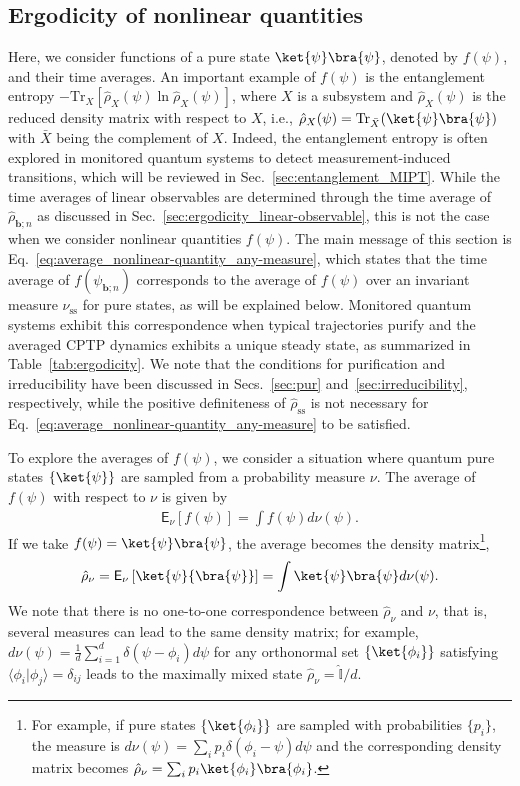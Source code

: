 \documentclass[preprint,pteplogo]{ptephy_v2}%
\numberwithin{equation}{section}
\theoremstyle{definition}
\newcommand{\ketbra}[1]{\ket{#1}\bra{#1}}
\begin{document}
\subsection{Ergodicity of nonlinear quantities}
\label{sec:ergodicity_nonlinear-quantity}
Here, we consider functions of a pure state $\ketbra{\psi}$, denoted by $f(\psi)$, and their time averages. 
An important example of $f(\psi)$ is the entanglement entropy $-\mathrm{Tr}_X\left[\hat{\rho}_X(\psi)\ln\hat{\rho}_X(\psi)\right]$, where $X$ is a subsystem and $\hat{\rho}_X(\psi)$ is the reduced density matrix with respect to $X$, i.e., $\hat{\rho}_X(\psi)=\mathrm{Tr}_{\bar{X}}(\ket{\psi}\bra{\psi})$ with $\bar{X}$ being the complement of $X$. 
Indeed, the entanglement entropy is often explored in monitored quantum systems to detect measurement-induced transitions, which will be reviewed in Sec.~\ref{sec:entanglement_MIPT}. 
While the time averages of linear observables are determined through the time average of $\hat{\rho}_{\bm{b};n}$ as discussed in Sec.~\ref{sec:ergodicity_linear-observable}, this is not the case when we consider nonlinear quantities $f(\psi)$. 
The main message of this section is Eq.~\eqref{eq:average_nonlinear-quantity_any-measure}, which states that the time average of $f(\psi_{\bm{b};n})$ corresponds to the average of $f(\psi)$ over an invariant measure $\nu_\mathrm{ss}$ for pure states, as will be explained below. 
Monitored quantum systems exhibit this correspondence when typical trajectories purify and the averaged CPTP dynamics exhibits a unique steady state, as summarized in Table~\ref{tab:ergodicity}. 
We note that the conditions for purification and irreducibility have been discussed in Secs.~\ref{sec:pur} and~\ref{sec:irreducibility}, respectively, while the positive definiteness of $\hat{\rho}_\mathrm{ss}$ is not necessary for Eq.~\eqref{eq:average_nonlinear-quantity_any-measure} to be satisfied. 

To explore the averages of $f(\psi)$, we consider a situation where quantum pure states $\{\ket{\psi}\}$ are sampled from a probability measure $\nu$. 
The average of $f(\psi)$ with respect to $\nu$ is given by
\begin{align}
    \mathsf{E}_\nu[f(\psi)]=\int f(\psi)d\nu(\psi).
\end{align}
If we take $f(\psi)=\ket{\psi}\bra{\psi}$, the average becomes the density matrix\footnote{
For example, if pure states $\{\ket{\phi_i}\}$ are sampled with probabilities $\{p_i\}$, the measure is $d\nu(\psi)=\sum_ip_i\delta(\phi_i-\psi)d\psi$ and the corresponding density matrix becomes $\hat{\rho}_\nu=\sum_ip_i\ket{\phi_i}\bra{\phi_i}$.
},
\begin{align}\hat{\rho}_\nu=\mathsf{E}_\nu\left[\ket{\psi}{\bra{\psi}}\right]
    =\int\ket{\psi}\bra{\psi}d\nu(\psi).
    \label{eq:density-matrix_averaged_measure}
\end{align}
We note that there is no one-to-one correspondence between $\hat{\rho}_\nu$ and $\nu$, that is, several measures can lead to the same density matrix; for example, $d\nu(\psi)=\frac{1}{d}\sum_{i=1}^d\delta(\psi-\phi_i)d\psi$ for any orthonormal set $\{\ket{\phi_i}\}$ satisfying $\langle\phi_i|\phi_j\rangle=\delta_{ij}$ leads to the maximally mixed state $\hat{\rho}_\nu=\mathbb{\hat{I}}/d$. 
\end{document}
